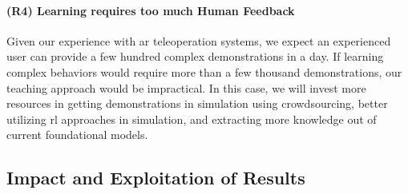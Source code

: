 \documentclass{erc-B2}
\begin{document}
\paragraph{(R4) Learning requires too much Human Feedback}
Given our experience with \gls*{ar} teleoperation systems, we expect an experienced user can provide a few hundred complex demonstrations in a day. If learning complex behaviors would require more than a few thousand demonstrations, our teaching approach would be impractical. In this case, we will invest more resources in getting demonstrations in simulation using crowdsourcing, better utilizing \gls*{rl} approaches in simulation, and extracting more knowledge out of current foundational models. 




\subsection{Impact and Exploitation of Results}
\label{sec:impact}
\end{document}
